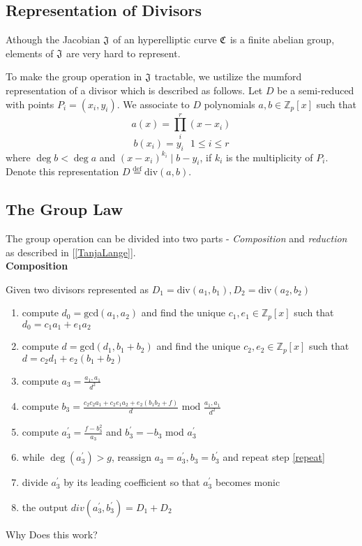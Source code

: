 \subsection{Representation of Divisors}

Athough the Jacobian $\mathfrak{J}$ of an hyperelliptic curve $\mathfrak{C}$ is a finite abelian group, elements of $\mathfrak{J}$ are very hard to represent. 

\begin{example}
\end{example} 


To make the group operation in $\mathfrak{J}$ tractable, we ustilize the mumford representation of a divisor which is described as follows. Let $D$ be a semi-reduced with points $P_i = (x_i,y_i)$. We associate to $D$ polynomials $a,b \in \mathbb{Z}_p[x]$ such that $$a(x) = \prod^r_i (x - x_i) $$ $$ b(x_i) = y_i \text{ } 1 \leq i \leq r $$ where $\deg b < \deg a$ and $(x - x_i)^{k_i} \mid b - y_i$, if $k_i$ is the multiplicity of $P_i$. Denote this representation $D \stackrel{\text{def}}{=} \text{div} (a,b)$.

\subsection{The Group Law}

The group operation can be divided into two parts - \textit{Composition} and \textit{reduction} as described in [\ref{TanjaLange}]. \\ 	


\large{\textbf{Composition}}

Given two divisors represented as $D_1= \text{div}(a_1,b_1), D_2 = \text{div} (a_2,b_2) $ 

\begin{enumerate}[1.]
	\item compute $d_0 = \text{gcd}(a_1,a_2)$ and find the unique $c_1,e_1 \in \mathbb{Z}_p[x]$ such that $d_0 = c_1a_1 + e_1a_2$ 
	\item compute $d = \text{gcd}(d_1,b_1 + b_2)$ and find the unique $c_2, e_2 \in \mathbb{Z}_p[x]$ such that $d = c_2d_1 + e_2(b_1 + b_2)$ 
	\item compute $a_3 = \frac{a_1,a_1}{d^2}$
	\item compute $b_3 = \frac{c_2c_2a_1 + c_2e_1a_2 + e_2(b_1b_2 + f)}{d} \text{ mod } \frac{a_1,a_1}{d^2}$
	\item \label{repeat} compute $a_3^\prime = \frac{f - b_3^2}{a_3}$ and $b_3^\prime = - b_3$ mod $a_3^\prime$ 
	\item while $\deg (a_3^\prime ) > g$, reassign $a_3 = a_3^\prime, b_3 = b_3^\prime$ and repeat step \ref{repeat}
	\item divide $a_3^\prime $ by its leading coefficient so that $a_3^\prime $ becomes monic
	\item the output $div(a_3^\prime,b_3^\prime) = D_1 + D_2$ 
\end{enumerate}


Why Does this work? 

\begin{example}
\end{example}




